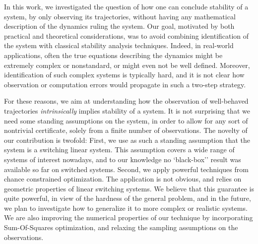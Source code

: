 In this work, we investigated the question of how one can conclude stability of a system, by only observing its trajectories, without having any mathematical description of the dynamics ruling the system.   Our goal, motivated by both practical and theoretical considerations, was to avoid combining identification of the system with classical stability analysis techniques. Indeed, in real-world applications, often the true equations describing the dynamics might be extremely complex or nonstandard, or might even not be well defined. Moreover, identification of such complex systems is typically hard, and it is not clear how observation or computation errors would propagate in such a two-step strategy. 

For these reasons, we aim at understanding how the observation of well-behaved trajectories \emph{intrinsically} implies stability of a system. It is not surprising that we need some standing assumptions on the system, in order to allow for any sort of nontrivial certificate, solely from a finite number of observations. The novelty of our contribution is twofold: 
First, we use as such a standing assumption that the system is a switching linear system.  This assumption covers a wide range of systems of interest nowadays, and to our knowledge no `black-box''  result was available so far on switched systems.  
Second, we apply powerful techniques from chance constrained optimization.  The application is not obvious, and relies on geometric properties of linear switching systems. We believe that this guarantee is quite powerful, in view of the hardness of the general problem, and in the future, we plan to investigate how to generalize it to more complex or realistic systems.  We are also improving the numerical properties of our technique by incorporating Sum-Of-Squares optimization, and relaxing the sampling assumptions on the observations.
